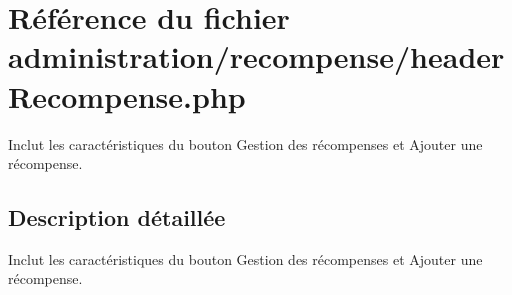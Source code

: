 \hypertarget{headerRecompense_8php}{}\section{Référence du fichier administration/recompense/header\+Recompense.php}
\label{headerRecompense_8php}


Inclut les caractéristiques du bouton Gestion des récompenses et Ajouter une récompense.  




\subsection{Description détaillée}
Inclut les caractéristiques du bouton Gestion des récompenses et Ajouter une récompense. 

